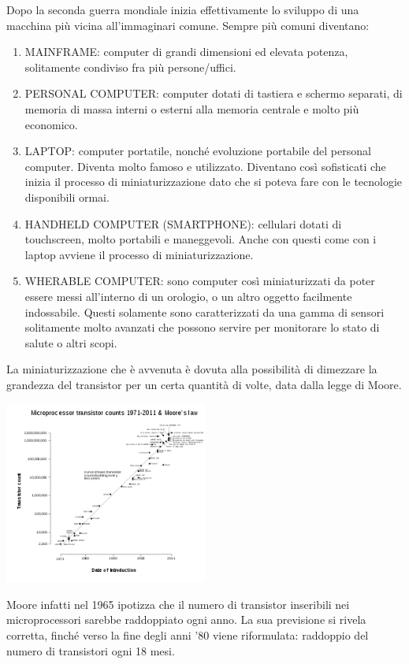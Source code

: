 \documentclass[
  paper=a4,
  oneside  ,captions=tableheading
]{scrbook}
\providecommand{\tightlist}{%
  \setlength{\itemsep}{0pt}\setlength{\parskip}{0pt}}
\begin{document}
Dopo la seconda guerra mondiale inizia effettivamente lo sviluppo di una
macchina più vicina all'immaginari comune. Sempre più comuni diventano:

\begin{enumerate}
\def\labelenumi{\arabic{enumi}.}
\tightlist
\item
  MAINFRAME: computer di grandi dimensioni ed elevata potenza,
  solitamente condiviso fra più persone/uffici.
\item
  PERSONAL COMPUTER: computer dotati di tastiera e schermo separati, di
  memoria di massa interni o esterni alla memoria centrale e molto più
  economico.
\item
  LAPTOP: computer portatile, nonché evoluzione portabile del personal
  computer. Diventa molto famoso e utilizzato. Diventano così
  sofisticati che inizia il processo di miniaturizzazione dato che si
  poteva fare con le tecnologie disponibili ormai.
\item
  HANDHELD COMPUTER (SMARTPHONE): cellulari dotati di touchscreen, molto
  portabili e maneggevoli. Anche con questi come con i laptop avviene il
  processo di miniaturizzazione.
\item
  WHERABLE COMPUTER: sono computer così miniaturizzati da poter essere
  messi all'interno di un orologio, o un altro oggetto facilmente
  indossabile. Questi solamente sono caratterizzati da una gamma di
  sensori solitamente molto avanzati che possono servire per monitorare
  lo stato di salute o altri scopi.
\end{enumerate}

La miniaturizzazione che è avvenuta è dovuta alla possibilità di
dimezzare la grandezza del transistor per un certa quantità di volte,
data dalla legge di Moore.

\includegraphics[height=6cm]{./image/290px-Transistor_Count_and_Moore's_Law_-_2011.svg.png}

Moore infatti nel 1965 ipotizza che il numero di transistor inseribili
nei microprocessori sarebbe raddoppiato ogni anno. La sua previsione si
rivela corretta, finché verso la fine degli anni '80 viene riformulata:
raddoppio del numero di transistori ogni 18 mesi.
\end{document}
